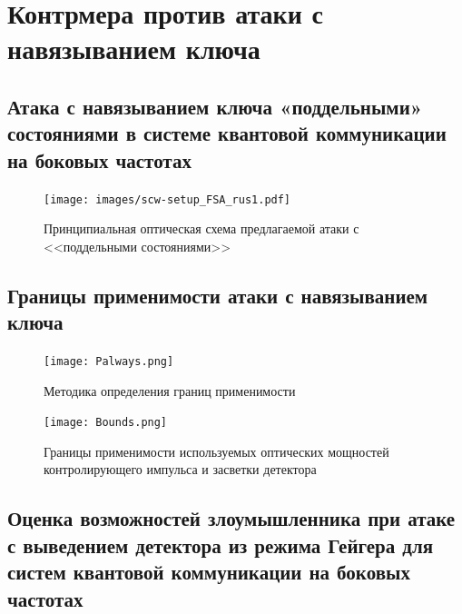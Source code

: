\chapter{Контрмера против атаки с навязыванием ключа} \label{ch:ch3}


\section{Атака с навязыванием ключа «поддельными» состояниями в системе квантовой коммуникации на боковых частотах} \label{sec:ch3/sec1}

 \begin{figure}[ht]
  \centering
  \texttt{[image: images/scw-setup\_FSA\_rus1.pdf]}
  \caption{Принципиальная оптическая схема предлагаемой атаки с <<поддельными состояниями>>}
  \label{fig:SCW_FSA}
\end{figure}

\pagebreak

\section{Границы применимости атаки с навязыванием ключа} \label{sec:ch3/sec2}

 \begin{figure}[ht]
  \centering
  \texttt{[image: Palways.png]}
  \caption{Методика определения границ применимости}
  \label{fig:Palways}
\end{figure}


 \begin{figure}[ht]
  \centering
  \texttt{[image: Bounds.png]}
  \caption{Границы применимости используемых оптических мощностей контролирующего импульса и засветки детектора}
  \label{fig:Bounds}
\end{figure}

\pagebreak

\section{Оценка возможностей злоумышленника при атаке с выведением детектора из режима Гейгера для систем квантовой коммуникации на боковых частотах} \label{sec:ch3/sec3}
 
